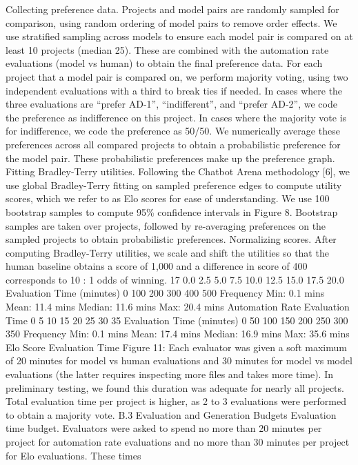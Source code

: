Collecting preference data.
Projects and model pairs are randomly sampled for comparison, using
random ordering of model pairs to remove order effects. We use stratified sampling across models to
ensure each model pair is compared on at least 10 projects (median 25). These are combined with the
automation rate evaluations (model vs human) to obtain the final preference data.
For each project that a model pair is compared on, we perform majority voting, using two independent
evaluations with a third to break ties if needed. In cases where the three evaluations are “prefer
AD-1”, “indifferent”, and “prefer AD-2”, we code the preference as indifference on this project. In
cases where the majority vote is for indifference, we code the preference as 50/50. We numerically
average these preferences across all compared projects to obtain a probabilistic preference for the
model pair. These probabilistic preferences make up the preference graph.
Fitting Bradley-Terry utilities.
Following the Chatbot Arena methodology [6], we use global
Bradley-Terry fitting on sampled preference edges to compute utility scores, which we refer to as Elo
scores for ease of understanding. We use 100 bootstrap samples to compute 95\% confidence intervals
in Figure 8. Bootstrap samples are taken over projects, followed by re-averaging preferences on the
sampled projects to obtain probabilistic preferences.
Normalizing scores.
After computing Bradley-Terry utilities, we scale and shift the utilities so that
the human baseline obtains a score of 1,000 and a difference in score of 400 corresponds to 10 : 1
odds of winning.
17
0.0
2.5
5.0
7.5
10.0
12.5
15.0
17.5
20.0
Evaluation Time (minutes)
0
100
200
300
400
500
Frequency
Min: 0.1 mins
Mean: 11.4 mins
Median: 11.6 mins
Max: 20.4 mins
Automation Rate Evaluation Time
0
5
10
15
20
25
30
35
Evaluation Time (minutes)
0
50
100
150
200
250
300
350
Frequency
Min: 0.1 mins
Mean: 17.4 mins
Median: 16.9 mins
Max: 35.6 mins
Elo Score Evaluation Time
Figure 11: Each evaluator was given a soft maximum of 20 minutes for model vs human evaluations
and 30 minutes for model vs model evaluations (the latter requires inspecting more files and takes
more time). In preliminary testing, we found this duration was adequate for nearly all projects. Total
evaluation time per project is higher, as 2 to 3 evaluations were performed to obtain a majority vote.
B.3
Evaluation and Generation Budgets
Evaluation time budget.
Evaluators were asked to spend no more than 20 minutes per project for
automation rate evaluations and no more than 30 minutes per project for Elo evaluations. These times
